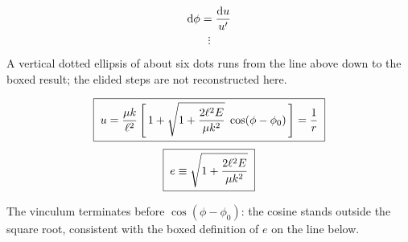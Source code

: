 \documentclass[11pt]{article}
\begin{document}
\[
\mathrm{d}\phi = \frac{\mathrm{d} u}{u'}
\]
\[
\vdots
\]

\noindent A vertical dotted ellipsis of about six dots runs from the line above
down to the boxed result; the elided steps are not reconstructed here.

\[
\boxed{\;
u = \frac{\mu k}{\ell^{2}}
   \left[\,1 + \sqrt{1 + \frac{2\ell^{2}E}{\mu k^{2}}}\;\cos(\phi - \phi_{0})\,\right]
 = \frac{1}{r}
\;}
\]
\[
\boxed{\;
e \equiv \sqrt{1 + \frac{2\ell^{2}E}{\mu k^{2}}}
\;}
\]

\begin{remark}
The vinculum terminates before $\cos(\phi-\phi_{0})$: the cosine stands outside
the square root, consistent with the boxed definition of $e$ on the line below.
\end{remark}
\end{document}
